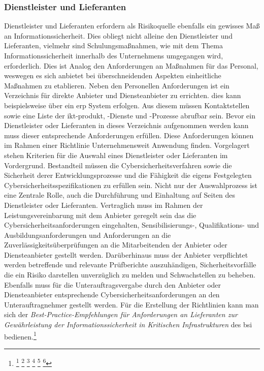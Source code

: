 \documentclass[11pt,a4paper,hidelinks]{article}   %
\begin{document}
            \subsubsection{Dienstleister und Lieferanten} 
            Dienstleister und Lieferanten erfordern als Risikoquelle ebenfalls ein gewisses Maß an Informationssicherheit. Dies obliegt nicht alleine den Dienstleister und Lieferanten, vielmehr sind Schulungsmaßnahmen, wie mit dem Thema Informationssicherheit innerhalb des Unternehmens umgegangen wird, erforderlich. Dies ist Analog den Anforderungen an Maßnahmen für das Personal, weswegen es sich anbietet bei überschneidenden Aspekten einheitliche Maßnahmen zu etablieren.
            Neben den Personellen Anforderungen ist ein Verzeichnis für direkte Anbieter und Diensteanbieter zu errichten. dies kann beispielsweise über ein \gls{erp} System erfolgen. Aus diesem müssen Kontaktstellen sowie eine Liste der \gls{ikt-produkt}, -Dienste und -Prozesse abrufbar sein. Bevor ein Dienstleister oder Lieferanten in dieses Verzeichnis aufgenommen werden kann muss dieser entsprechende Anforderungen erfüllen. Diese Anforderungen können im Rahmen einer Richtlinie Unternehmensweit Anwendung finden. Vorgelagert stehen Kriterien für die Auswahl eines Dienstleister oder Lieferanten im Vordergrund. Bestandteil müssen die Cybersicherheitsverfahren sowie die Sicherheit derer Entwicklungsprozesse und die Fähigkeit die eigens Festgelegten Cybersicherheitsspezifikationen zu erfüllen sein. Nicht nur der Auswahlprozess ist eine Zentrale Rolle, auch die Durchführung und Einhaltung auf Seiten des Dienstleister oder Lieferanten. Vertraglich muss im Rahmen der Leistungsvereinbarung mit dem Anbieter geregelt sein das die Cybersicherheitsanforderungen eingehalten, Sensibilisierungs-, Qualifikations- und Ausbildungsanforderungen und Anforderungen an die Zuverlässigkeitsüberprüfungen an die Mitarbeitenden der Anbieter oder Diensteanbieter gestellt werden. Darüberhinaus muss der Anbieter verpflichtet werden betreffende und relevante Prüfberichte auszuhändigen, Sicherheitsvorfälle die ein Risiko darstellen unverzüglich zu melden und Schwachstellen zu beheben. Ebenfalls muss für die Unterauftragsvergabe durch den Anbieter oder Diensteanbieter entsprechende Cybersicherheitsanforderungen an den Unterauftragnehmer gestellt werden. Für die Erstellung der Richtlinien kann man sich der \emph{Best-Practice-Empfehlungen für Anforderungen an Lieferanten zur Gewährleistung der Informationssicherheit in Kritischen Infrastrukturen} des \gls{bsi} bedienen.\footnote{
                \footcite[Vgl.][, Nummer 5.2.]{EU2024-2690}
                \footcite[Vgl.][, Nummer 8.2.1.]{EU2024-2690}
                \footcite[Vgl.][, Nummer 10.1.2. Buchstabe a \& b]{EU2024-2690}
                \footcite[Vgl.][, S. 5]{bsi:36ef69}
                \footcite[Vgl.][, Nummer 5.1.2.]{EU2024-2690}
                \footcite[Vgl.][, Nummer 5.1.4.]{EU2024-2690}
            }
\end{document}
